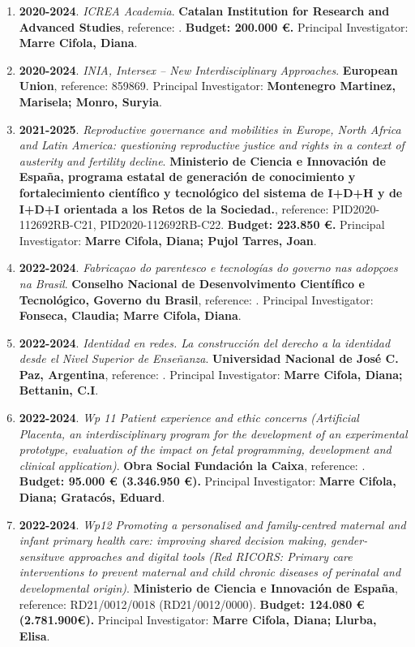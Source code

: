 \begin{enumerate}
\item {\bf 2020-2024}. {\it ICREA Academia}. {\bf Catalan Institution for Research and Advanced Studies},  reference: . {\bf  Budget: 200.000 €.} Principal Investigator: {\bf Marre Cifola, Diana}.\filbreak
\item {\bf 2020-2024}. {\it INIA, Intersex – New Interdisciplinary Approaches}. {\bf European Union},  reference: 859869. {\bf  } Principal Investigator: {\bf Montenegro Martinez, Marisela; Monro, Suryia}.\filbreak
\item {\bf 2021-2025}. {\it Reproductive governance and mobilities in Europe, North Africa and Latin America: questioning reproductive justice and rights in a context of austerity and fertility decline}. {\bf Ministerio de Ciencia e Innovación de España, programa estatal de generación de conocimiento y fortalecimiento científico y tecnológico del sistema de I+D+H y de I+D+I orientada a los Retos de la Sociedad.},  reference: PID2020-112692RB-C21, PID2020-112692RB-C22. {\bf  Budget: 223.850 €.} Principal Investigator: {\bf Marre Cifola, Diana; Pujol Tarres, Joan}.\filbreak
\item {\bf 2022-2024}. {\it Fabricaçao do parentesco e tecnologías do governo nas adopçoes na Brasil}. {\bf Conselho Nacional de Desenvolvimento Científico e Tecnológico, Governo du Brasil},  reference: . {\bf  } Principal Investigator: {\bf Fonseca, Claudia; Marre Cifola, Diana}.\filbreak
\item {\bf 2022-2024}. {\it Identidad en redes. La construcción del derecho a la identidad desde el Nivel Superior de Enseñanza}. {\bf Universidad Nacional de José C. Paz, Argentina},  reference: . {\bf  } Principal Investigator: {\bf Marre Cifola, Diana; Bettanin, C.I}.\filbreak
\item {\bf 2022-2024}. {\it Wp 11 Patient experience and ethic concerns  (Artificial Placenta, an interdisciplinary program for the development of an experimental prototype, evaluation of the impact on fetal programming, development and clinical application)}. {\bf Obra Social Fundación la Caixa},  reference: . {\bf  Budget: 95.000 € (3.346.950 €).} Principal Investigator: {\bf Marre Cifola, Diana; Gratacós, Eduard}.\filbreak
\item {\bf 2022-2024}. {\it Wp12 Promoting a personalised and family-centred maternal and infant primary health care: improving shared decision making, gender-sensituve approaches and digital tools (Red RICORS: Primary care interventions to prevent maternal and child chronic diseases of perinatal and developmental origin)}. {\bf Ministerio de Ciencia e Innovación de España},  reference: RD21/0012/0018 (RD21/0012/0000). {\bf  Budget: 124.080 € (2.781.900€).} Principal Investigator: {\bf Marre Cifola, Diana; Llurba, Elisa}.\filbreak

\end{enumerate}

